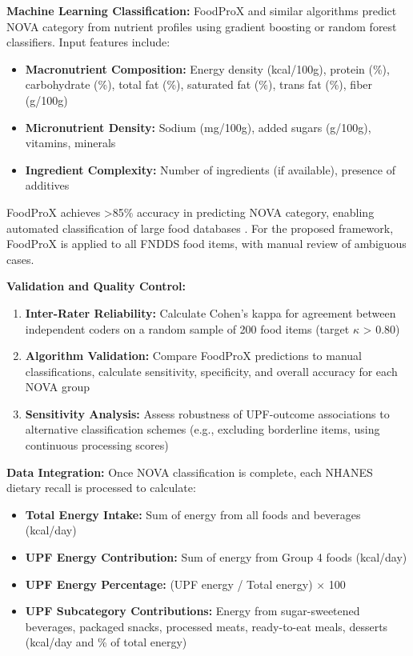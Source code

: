 \documentclass[journal,twoside,10pt]{IEEEtran}
\begin{document}
\textbf{Machine Learning Classification:}
FoodProX \cite{ref48} and similar algorithms predict NOVA category from nutrient profiles using gradient boosting or random forest classifiers. Input features include:
\begin{itemize}
\item \textbf{Macronutrient Composition:} Energy density (kcal/100g), protein (\%), carbohydrate (\%), total fat (\%), saturated fat (\%), trans fat (\%), fiber (g/100g)
\item \textbf{Micronutrient Density:} Sodium (mg/100g), added sugars (g/100g), vitamins, minerals
\item \textbf{Ingredient Complexity:} Number of ingredients (if available), presence of additives
\end{itemize}

FoodProX achieves >85\% accuracy in predicting NOVA category, enabling automated classification of large food databases \cite{ref48}. For the proposed framework, FoodProX is applied to all FNDDS food items, with manual review of ambiguous cases.

\textbf{Validation and Quality Control:}
\begin{enumerate}
\item \textbf{Inter-Rater Reliability:} Calculate Cohen's kappa for agreement between independent coders on a random sample of 200 food items (target $\kappa$ > 0.80)
\item \textbf{Algorithm Validation:} Compare FoodProX predictions to manual classifications, calculate sensitivity, specificity, and overall accuracy for each NOVA group
\item \textbf{Sensitivity Analysis:} Assess robustness of UPF-outcome associations to alternative classification schemes (e.g., excluding borderline items, using continuous processing scores)
\end{enumerate}

\textbf{Data Integration:}
Once NOVA classification is complete, each NHANES dietary recall is processed to calculate:
\begin{itemize}
\item \textbf{Total Energy Intake:} Sum of energy from all foods and beverages (kcal/day)
\item \textbf{UPF Energy Contribution:} Sum of energy from Group 4 foods (kcal/day)
\item \textbf{UPF Energy Percentage:} (UPF energy / Total energy) $\times$ 100
\item \textbf{UPF Subcategory Contributions:} Energy from sugar-sweetened beverages, packaged snacks, processed meats, ready-to-eat meals, desserts (kcal/day and \% of total energy)
\end{itemize}
\end{document}
